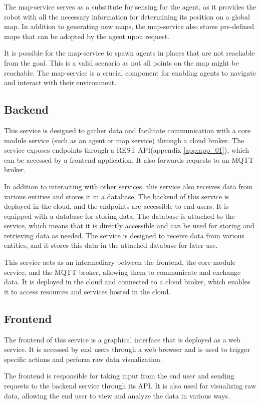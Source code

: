 The map-service serves as a substitute for sensing for the agent, as it provides the robot with all the necessary information for determining its position on a global map. In addition to generating new maps, the map-service also stores pre-defined maps that can be adopted by the agent upon request.

It is possible for the map-service to spawn agents in places that are not reachable from the goal. This is a valid scenario as not all points on the map might be reachable. The map-service is a crucial component for enabling agents to navigate and interact with their environment.

\subsection{Backend}
This service is designed to gather data and facilitate communication with a core module service (such as an agent or map service) through a cloud broker. The service exposes endpoints through a REST API(appendix \ref{app:app_01}), which can be accessed by a frontend application. It also forwards requests to an MQTT broker.

In addition to interacting with other services, this service also receives data from various entities and stores it in a database. The backend of this service is deployed in the cloud, and the endpoints are accessible to end-users. It is equipped with a database for storing data. The database is attached to the service, which means that it is directly accessible and can be used for storing and retrieving data as needed. The service is designed to receive data from various entities, and it stores this data in the attached database for later use.

This service acts as an intermediary between the frontend, the core module service, and the MQTT broker, allowing them to communicate and exchange data. It is deployed in the cloud and connected to a cloud broker, which enables it to access resources and services hosted in the cloud.

\subsection{Frontend}
The frontend of this service is a graphical interface that is deployed as a web service. It is accessed by end users through a web browser and is used to trigger specific actions and perform raw data visualization.

The frontend is responsible for taking input from the end user and sending requests to the backend service through its API. It is also used for visualizing raw data, allowing the end user to view and analyze the data in various ways.

